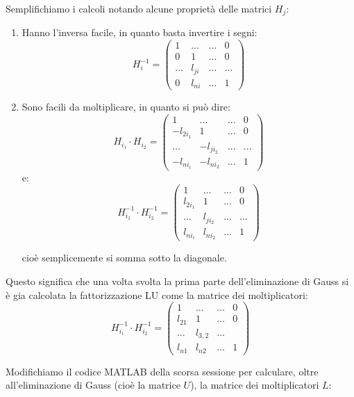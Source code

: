 \documentclass[a4paper,11pt]{article}
\begin{document}
Semplifichiamo i calcoli notando alcune proprietà delle matrici $H_j$:
\begin{enumerate}
	\item Hanno l'inversa facile, in quanto basta invertire i segni:
	$$
	H_i^{-1} = \begin{pmatrix}
		1 & ... & ... & 0 \\
		0 & 1 & ... & 0 \\
		... & l_{ji} & ... & ... \\
		0 & l_{ni} & ... & 1
	\end{pmatrix}
	$$

	\item Sono facili da moltiplicare, in quanto si può dire:
	$$
		H_{i_1} \cdot H_{i_2} = \begin{pmatrix}
		1 & ... & ... & 0 \\
		-l_{2i_1} & 1 & ... & 0 \\
		... & -l_{ji_2} & ... & ... \\
		-l_{ni_i} & -l_{ni_2} & ... & 1
	\end{pmatrix}
	$$
	e:	
	$$
	H_{i_1}^{-1} \cdot H_{i_2}^{-1} = \begin{pmatrix}
		1 & ... & ... & 0 \\
		l_{2i_1} & 1 & ... & 0 \\
		... & l_{ji_2} & ... & ... \\
		l_{ni_i} & l_{ni_2} & ... & 1
	\end{pmatrix}
	$$

	cioè semplicemente si somma sotto la diagonale.
\end{enumerate}

Questo significa che una volta svolta la prima parte dell'eliminazione di Gauss si è gia calcolata la fattorizzazione LU come la matrice dei moltiplicatori:
$$
H_{i_1}^{-1} \cdot H_{i_2}^{-1} = \begin{pmatrix}
	1 & ... & ... & 0 \\
	l_{21} & 1 & ... & 0 \\
	... & l_{3,2} & ...\\
	l_{n1} & l_{n2} & ... & 1
\end{pmatrix}
$$

\par\smallskip

Modifichiamo il codice MATLAB della scorsa sessione per calculare, oltre all'eliminazione di Gauss (cioè la matrice $U$), la matrice dei moltiplicatori $L$:


\end{document}
